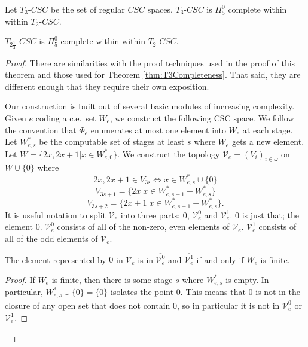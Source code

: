 \documentclass[10pt,a4paper]{amsart}
\begin{document}
\begin{theorem}\label{thm:T3Completeness}
    Let $T_3$-$CSC$ be the set of regular $CSC$ spaces.
    $T_3$-$CSC$ is $\Pi_5^0$ complete within within $T_2$-$CSC$.
\end{theorem}

    \begin{theorem}
        $T_{2\frac12}$-$CSC$ is $\Pi_5^0$ complete within within $T_2$-$CSC$.
    \end{theorem}

    \begin{proof}
        There are similarities with the proof techniques used in the proof of this theorem and those used for Theorem \ref{thm:T3Completeness}.
        That said, they are different enough that they require their own exposition.

         Our construction is built out of several basic modules of increasing complexity.
         Given $e$ coding a c.e.\ set $W_e$, we construct the following CSC space.
        We follow the convention that $\Phi_e$ enumerates at most one element into $W_e$ at each stage.
        Let $W_{e,s}^*$ be the computable set of stages at least $s$ where $W_e$ gets a new element.
        Let $W=\{2x,2x+1 \vert x\in W_{e,0}^*\}$.
        We construct the topology $\mathcal{V}_e=(V_i)_{i\in\omega}$ on $W\cup\{0\}$ where
    \[2x,2x+1\in V_{3s} \iff x\in W_{e,s}^*\cup\{0\}\]\[V_{3s+1}=\{2x\vert x\in W_{e,s+1}^*-W_{e,s}^*\}\]
    \[V_{3s+2}=\{2x+1\vert x\in W_{e,s+1}^*-W_{e,s}^*\}.\]
        It is useful notation to split $\mathcal{V}_e$ into three parts: $0$, $\mathcal{V}_e^0$ and $\mathcal{V}_e^1$.
        $0$ is just that; the element $0$.
        $\mathcal{V}_e^0$ consists of all of the non-zero, even elements of $\mathcal{V}_e$.
        $\mathcal{V}_e^1$ consists of all of the odd elements of $\mathcal{V}_e$.

    
    \begin{claim}\label{claim:basicUnit1/2}
        The element represented by $0$ in $\mathcal{V}_e$ is in $\overline{\mathcal{V}_e^0}$ and $\overline{\mathcal{V}_e^1}$ if and only if $W_e$ is finite.
    \end{claim}

    \begin{proof}
    If $W_e$ is finite, then there is some stage $s$ where $W_{e,s}^*$ is empty.
    In particular, $W_{e,s}^*\cup\{0\}=\{0\}$ isolates the point $0$.
    This means that $0$ is not in the closure of any open set that does not contain $0$, so in particular it is not in $\overline{\mathcal{V}_e^0}$ or $\overline{\mathcal{V}_e^1}$.


\end{proof}
\end{proof}
\end{document}
